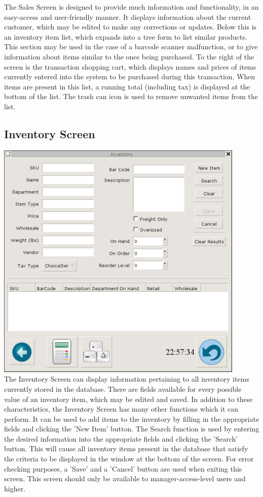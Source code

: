 \documentclass{report}
\begin{document}
    The Sales Screen is designed to provide much information and functionality, in
    an easy-access and user-friendly manner.  It displays
    information about the current customer, which may be edited to
    make any corrections or updates.  Below this is an inventory item
    list, which expands into a tree form to list similar
    products.  This section may be used in the case of a barcode
    scanner malfunction, or to give information about items similar
    to the ones being purchased.  To the right of the screen is the
    transaction shopping cart, which displays names and prices of
    items currently entered into the system to be purchased during this
    transaction.  When items are present in this list, a running
    total (including tax) is displayed at the bottom of the list.
    The trash can icon is used to remove unwanted items from the
    list.\\

    \subsection{Inventory Screen}
    \includegraphics{ys_inv_screener.png}\\

    The Inventory Screen can display information pertaining to all
    inventory items currently stored in the database.  There are
    fields available for every possible value of an
    inventory item, which may be edited and saved.  In addition to these
    characteristics, the Inventory Screen has many other functions which it can perform.
    It can be used to add items to the inventory by filling in the
    appropriate fields and clicking the 'New Item' button.  The
    Search function is used by entering the desired information
    into the appropriate fields and clicking the 'Search' button.
    This will cause all inventory items present in the database
    that satisfy the criteria to be displayed in the window at the
    bottom of the screen.  For error checking purposes, a 'Save'
    and a 'Cancel' button are used when exiting this screen.  This
    screen should only be available to manager-access-level users
    and higher.\\
\end{document}
